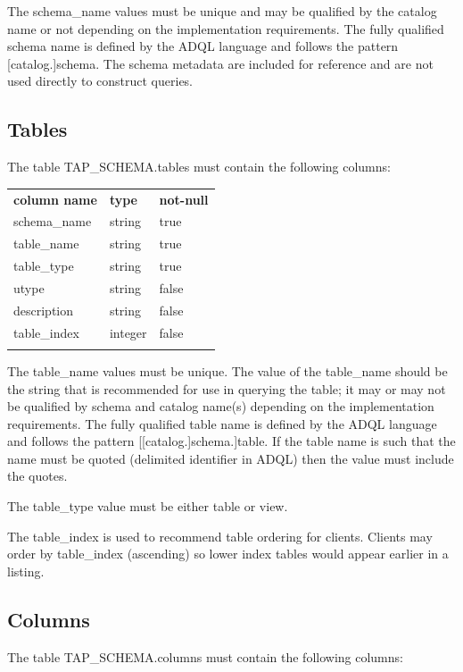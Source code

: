 \documentclass[11pt,letter]{ivoa}
\newcommand{\tapschema}{TAP\_SCHEMA}
\newcommand{\tapschema}{\mbox{%
  \relsize{-0.5}TAP\discretionary{-}{}{\kern-2pt\_}SCHEMA}}
\begin{document}
The schema\_name values must be unique and may be qualified by the 
catalog name or not depending on the implementation requirements. The fully 
qualified schema name is defined by the ADQL language and  follows the pattern 
[catalog.]schema. The schema metadata are included for reference and are not 
used directly to construct queries.

\subsection{Tables}
\label{sec:tap-schema-tables}
The table \tapschema.tables must contain the following columns:

\begin{inlinetable}
\begin{tabular}{l l l}
\sptablerule
\textbf{column name} & \textbf{type} & \textbf{not-null} \\
\sptablerule
schema\_name & string & true \\
table\_name & string & true \\
table\_type & string & true \\
utype & string & false \\
description & string & false \\
table\_index & integer & false \\
\sptablerule
\end{tabular}
\end{inlinetable}

The table\_name values must be unique. The value of the 
table\_name should be the string that is recommended for use in 
querying the table; it may or may not be qualified by schema and catalog name(s) 
depending on the implementation requirements. The fully qualified table name is 
defined by the ADQL language and follows the pattern [[catalog.]schema.]table. 
If the table name is such that the name must be quoted (delimited identifier in 
ADQL) then the value must include the quotes.

The table\_type value must be either table or view.

The table\_index is used to recommend table ordering for clients. Clients 
may order by table\_index (ascending) so lower index tables would appear 
earlier in a listing.

\subsection{Columns}
\label{sec:tap-schema-columns}
The table \tapschema.columns must contain the following columns:
\end{document}
